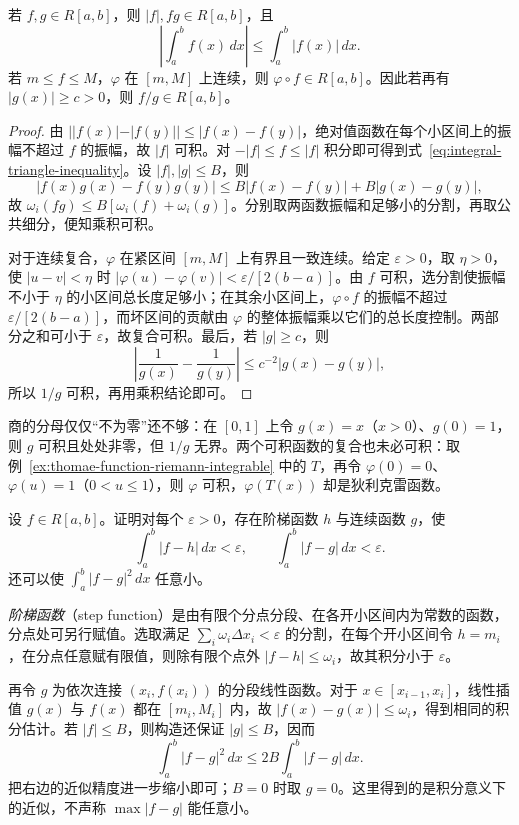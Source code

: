 \documentclass[UTF8,12pt,a4paper,fontset=fandol]{ctexbook}
\begin{document}
\begin{theorem}
\label{thm:riemann-integrable-closure}
若 $f,g\in R[a,b]$，则 $|f|,fg\in R[a,b]$，且
\begin{equation}
    \left|\int_a^b f(x)\,dx\right|
    \leq\int_a^b|f(x)|\,dx.
    \label{eq:integral-triangle-inequality}
\end{equation}
若 $m\leq f\leq M$，$\varphi$ 在 $[m,M]$ 上连续，则 $\varphi\circ f\in R[a,b]$。因此若再有 $|g(x)|\geq c>0$，则 $f/g\in R[a,b]$。
\end{theorem}
\begin{proof}
由 $||f(x)|-|f(y)||\leq|f(x)-f(y)|$，绝对值函数在每个小区间上的振幅不超过 $f$ 的振幅，故 $|f|$ 可积。对 $-|f|\leq f\leq|f|$ 积分即可得到式~\eqref{eq:integral-triangle-inequality}。设 $|f|,|g|\leq B$，则
\[
    |f(x)g(x)-f(y)g(y)|
    \leq B|f(x)-f(y)|+B|g(x)-g(y)|,
\]
故 $\omega_i(fg)\leq B[\omega_i(f)+\omega_i(g)]$。分别取两函数振幅和足够小的分割，再取公共细分，便知乘积可积。

对于连续复合，$\varphi$ 在紧区间 $[m,M]$ 上有界且一致连续。给定 $\varepsilon>0$，取 $\eta>0$，使 $|u-v|<\eta$ 时 $|\varphi(u)-\varphi(v)|<\varepsilon/[2(b-a)]$。由 $f$ 可积，选分割使振幅不小于 $\eta$ 的小区间总长度足够小；在其余小区间上，$\varphi\circ f$ 的振幅不超过 $\varepsilon/[2(b-a)]$，而坏区间的贡献由 $\varphi$ 的整体振幅乘以它们的总长度控制。两部分之和可小于 $\varepsilon$，故复合可积。最后，若 $|g|\geq c$，则
\[
    \left|\frac1{g(x)}-\frac1{g(y)}\right|
    \leq c^{-2}|g(x)-g(y)|,
\]
所以 $1/g$ 可积，再用乘积结论即可。
\end{proof}

商的分母仅仅“不为零”还不够：在 $[0,1]$ 上令 $g(x)=x$（$x>0$）、$g(0)=1$，则 $g$ 可积且处处非零，但 $1/g$ 无界。两个可积函数的复合也未必可积：取例~\ref{ex:thomae-function-riemann-integrable} 中的 $T$，再令 $\varphi(0)=0$、$\varphi(u)=1$（$0<u\leq1$），则 $\varphi$ 可积，$\varphi(T(x))$ 却是狄利克雷函数。

\begin{example}
\label{ex:step-and-continuous-integral-approximation}
设 $f\in R[a,b]$。证明对每个 $\varepsilon>0$，存在阶梯函数 $h$ 与连续函数 $g$，使
\[
    \int_a^b|f-h|\,dx<\varepsilon,\qquad
    \int_a^b|f-g|\,dx<\varepsilon.
\]
还可以使 $\int_a^b|f-g|^2\,dx$ 任意小。
\end{example}
\begin{solve}
\emph{阶梯函数}（step function）是由有限个分点分段、在各开小区间内为常数的函数，分点处可另行赋值。选取满足 $\sum_i\omega_i\Delta x_i<\varepsilon$ 的分割，在每个开小区间令 $h=m_i$，在分点任意赋有限值，则除有限个点外 $|f-h|\leq\omega_i$，故其积分小于 $\varepsilon$。

再令 $g$ 为依次连接 $(x_i,f(x_i))$ 的分段线性函数。对于 $x\in[x_{i-1},x_i]$，线性插值 $g(x)$ 与 $f(x)$ 都在 $[m_i,M_i]$ 内，故 $|f(x)-g(x)|\leq\omega_i$，得到相同的积分估计。若 $|f|\leq B$，则构造还保证 $|g|\leq B$，因而
\[
    \int_a^b|f-g|^2\,dx\leq2B\int_a^b|f-g|\,dx.
\]
把右边的近似精度进一步缩小即可；$B=0$ 时取 $g=0$。这里得到的是积分意义下的近似，不声称 $\max|f-g|$ 能任意小。
\end{solve}
\end{document}
